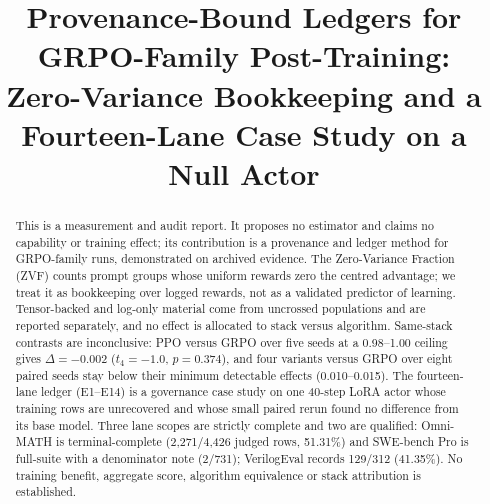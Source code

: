\documentclass[conference]{IEEEtran}
\begin{document}
\title{Provenance-Bound Ledgers for GRPO-Family Post-Training:\\
Zero-Variance Bookkeeping and a Fourteen-Lane Case Study on a Null Actor}

\author{
\and
{}
}

\maketitle

\begin{abstract}
This is a measurement and audit report. It proposes no estimator and claims
no capability or training effect; its contribution is a provenance and
ledger method for GRPO-family runs, demonstrated on archived evidence. The
Zero-Variance Fraction (ZVF) counts prompt groups whose uniform rewards zero
the centred advantage; we treat it as bookkeeping over logged rewards, not
as a validated predictor of learning. Tensor-backed and log-only material
come from uncrossed populations and are reported separately, and no effect
is allocated to stack versus algorithm. Same-stack contrasts are
inconclusive: PPO versus GRPO over five seeds at a 0.98--1.00 ceiling gives
$\Delta=-0.002$ ($t_4=-1.0$, $p=0.374$), and four variants versus GRPO over
eight paired seeds stay below their minimum detectable effects
(0.010--0.015). The fourteen-lane ledger (E1--E14) is a governance case
study on one 40-step LoRA actor whose training rows are unrecovered and
whose small paired rerun found no difference from its base model. Three
lane scopes are strictly complete and two are qualified: Omni-MATH is
terminal-complete (2,271/4,426 judged rows, 51.31\%) and SWE-bench Pro is
full-suite with a denominator note (2/731); VerilogEval records 129/312
(41.35\%). No training benefit, aggregate score, algorithm equivalence or
stack attribution is established.
\end{abstract}
\end{document}
